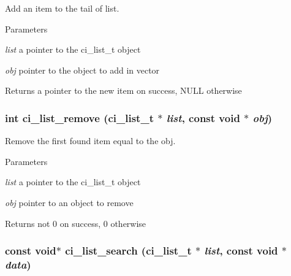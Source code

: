 Add an item to the tail of list. 
\begin{DoxyParams}{Parameters}
\item[{\em list}]a pointer to the ci\_\-list\_\-t object \item[{\em obj}]pointer to the object to add in vector \end{DoxyParams}
\begin{DoxyReturn}{Returns}
a pointer to the new item on success, NULL otherwise 
\end{DoxyReturn}
\hypertarget{group__LISTS_ga9cfabc4ce1570206306c99e62e96c5f7}{
\subsubsection[{ci\_\-list\_\-remove}]{\setlength{\rightskip}{0pt plus 5cm}int ci\_\-list\_\-remove ({\bf ci\_\-list\_\-t} $\ast$ {\em list}, \/  const void $\ast$ {\em obj})}}
\label{group__LISTS_ga9cfabc4ce1570206306c99e62e96c5f7}


Remove the first found item equal to the obj. 
\begin{DoxyParams}{Parameters}
\item[{\em list}]a pointer to the ci\_\-list\_\-t object \item[{\em obj}]pointer to an object to remove \end{DoxyParams}
\begin{DoxyReturn}{Returns}
not 0 on success, 0 otherwise 
\end{DoxyReturn}
\hypertarget{group__LISTS_ga285029e6cfd7bc7c36601f40b8617e75}{
\subsubsection[{ci\_\-list\_\-search}]{\setlength{\rightskip}{0pt plus 5cm}const void$\ast$ ci\_\-list\_\-search ({\bf ci\_\-list\_\-t} $\ast$ {\em list}, \/  const void $\ast$ {\em data})}}
\label{group__LISTS_ga285029e6cfd7bc7c36601f40b8617e75}


